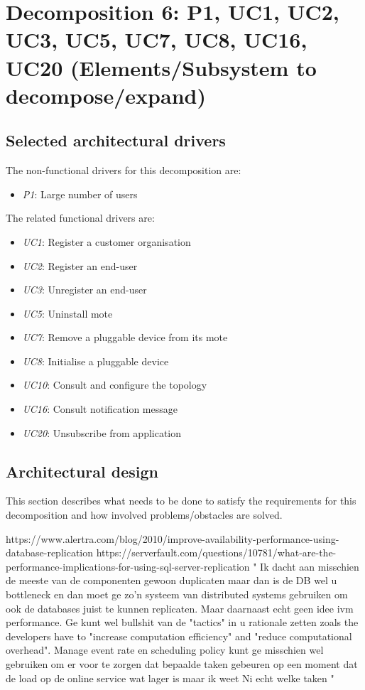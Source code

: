 \section{Decomposition 6: P1, UC1, UC2, UC3, UC5, UC7, UC8, UC16, UC20 (Elements/Subsystem to decompose/expand)}


\subsection*{Selected architectural drivers}
    The non-functional drivers for this decomposition are:
    \begin{itemize}
    	\item \emph{P1}: Large number of users
    \end{itemize}

    The related functional drivers are:
    \begin{itemize}
        \item \emph{UC1}: Register a customer organisation
        \item \emph{UC2}: Register an end-user
        \item \emph{UC3}: Unregister an end-user
        \item \emph{UC5}: Uninstall mote
        \item \emph{UC7}: Remove a pluggable device from its mote
        \item \emph{UC8}: Initialise a pluggable device
        \item \emph{UC10}: Consult and configure the topology
        \item \emph{UC16}: Consult notification message
        \item \emph{UC20}: Unsubscribe from application
    \end{itemize}


\subsection*{Architectural design}
    This section describes what needs to be done to satisfy the requirements for
    this decomposition and how involved problems/obstacles are solved.

    https://www.alertra.com/blog/2010/improve-availability-performance-using-database-replication
    https://serverfault.com/questions/10781/what-are-the-performance-implications-for-using-sql-server-replication
    "
    Ik dacht aan misschien de meeste van de componenten gewoon duplicaten maar dan is de DB wel u bottleneck en dan moet ge zo'n systeem van distributed systems gebruiken om ook de databases juist te kunnen replicaten.
    Maar daarnaast echt geen idee ivm performance. Ge kunt wel bullshit van de "tactics" in u rationale zetten zoals the developers have to "increase computation efficiency" and "reduce computational overhead".
    Manage event rate en scheduling policy kunt ge misschien wel gebruiken om er voor te zorgen dat bepaalde taken gebeuren op een moment dat de load op de online service wat lager is maar ik weet Ni echt welke taken
    "

